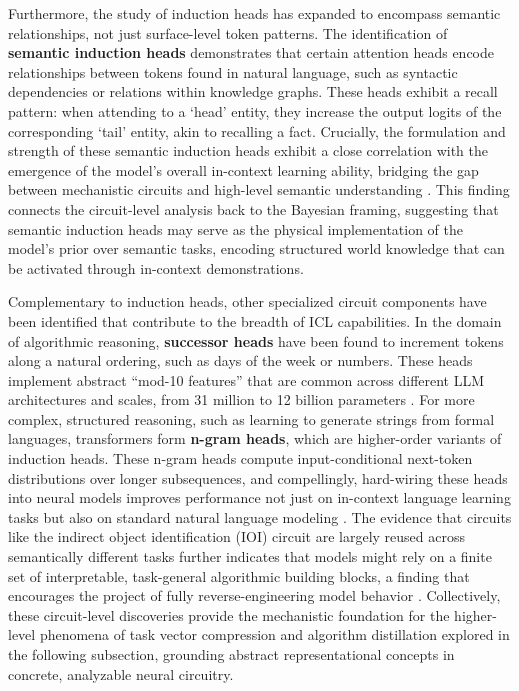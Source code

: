 \documentclass[11pt]{article}
\begin{document}
Furthermore, the study of induction heads has expanded to encompass semantic relationships, not just surface-level token patterns. The identification of \textbf{semantic induction heads} demonstrates that certain attention heads encode relationships between tokens found in natural language, such as syntactic dependencies or relations within knowledge graphs. These heads exhibit a recall pattern: when attending to a `head' entity, they increase the output logits of the corresponding `tail' entity, akin to recalling a fact. Crucially, the formulation and strength of these semantic induction heads exhibit a close correlation with the emergence of the model's overall in-context learning ability, bridging the gap between mechanistic circuits and high-level semantic understanding \cite{ref58}. This finding connects the circuit-level analysis back to the Bayesian framing, suggesting that semantic induction heads may serve as the physical implementation of the model's prior over semantic tasks, encoding structured world knowledge that can be activated through in-context demonstrations.

Complementary to induction heads, other specialized circuit components have been identified that contribute to the breadth of ICL capabilities. In the domain of algorithmic reasoning, \textbf{successor heads} have been found to increment tokens along a natural ordering, such as days of the week or numbers. These heads implement abstract ``mod-10 features'' that are common across different LLM architectures and scales, from 31 million to 12 billion parameters \cite{ref59}. For more complex, structured reasoning, such as learning to generate strings from formal languages, transformers form \textbf{n-gram heads}, which are higher-order variants of induction heads. These n-gram heads compute input-conditional next-token distributions over longer subsequences, and compellingly, hard-wiring these heads into neural models improves performance not just on in-context language learning tasks but also on standard natural language modeling \cite{ref60}. The evidence that circuits like the indirect object identification (IOI) circuit are largely reused across semantically different tasks further indicates that models might rely on a finite set of interpretable, task-general algorithmic building blocks, a finding that encourages the project of fully reverse-engineering model behavior \cite{ref61}. Collectively, these circuit-level discoveries provide the mechanistic foundation for the higher-level phenomena of task vector compression and algorithm distillation explored in the following subsection, grounding abstract representational concepts in concrete, analyzable neural circuitry.
\end{document}
